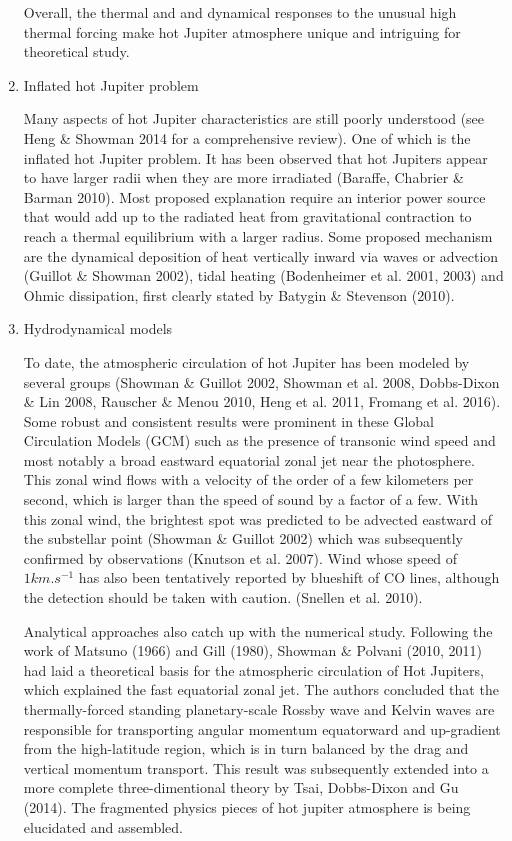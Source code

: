 \documentclass[11pt]{article}
\begin{document}
\begin{enumerate}
Overall, the thermal and and dynamical responses to the unusual high thermal forcing make hot Jupiter atmosphere unique and intriguing for theoretical study.

\item Inflated hot Jupiter problem

Many aspects of hot Jupiter characteristics are still poorly understood (see Heng \& Showman 2014 for a comprehensive review). One of which is the inflated hot Jupiter  problem. It has been observed that hot Jupiters appear to have larger radii when they are more irradiated (Baraffe, Chabrier \& Barman 2010). Most proposed explanation require an interior power source that would add up to the radiated heat from gravitational contraction to reach a thermal equilibrium with a larger radius. 
Some proposed mechanism are the dynamical deposition of heat vertically inward via waves or advection (Guillot \& Showman 2002), tidal heating (Bodenheimer et al. 2001, 2003) and Ohmic dissipation, first clearly stated by Batygin \& Stevenson (2010).  

\item Hydrodynamical models

To date, the atmospheric circulation of hot Jupiter has been modeled by several groups (Showman \& Guillot 2002, Showman et al. 2008, Dobbs-Dixon \& Lin 2008, Rauscher \& Menou 2010, Heng et al. 2011, Fromang et al. 2016). Some robust and consistent results were  prominent in these Global Circulation Models (GCM) such as the presence of transonic wind speed and most notably a broad eastward equatorial zonal jet near the photosphere. This zonal wind flows with a velocity of the order of a few kilometers per second, which is larger than the speed of sound by a factor of a few. With this zonal wind, the brightest spot was predicted to be advected eastward of the substellar point (Showman \& Guillot 2002) which was subsequently confirmed by observations (Knutson et al. 2007).  Wind whose speed of $1km.s^ {-1}$ has also been tentatively reported by blueshift of CO lines, although the detection should be taken with caution. (Snellen et al. 2010). 

Analytical approaches also catch up with the numerical study. Following the work of Matsuno (1966) and Gill (1980), Showman \& Polvani (2010, 2011) had laid a theoretical basis for the atmospheric circulation of Hot Jupiters, which explained the fast equatorial zonal jet. The authors concluded that the thermally-forced standing planetary-scale Rossby wave and Kelvin waves are responsible for transporting angular momentum equatorward and up-gradient from the high-latitude region, which is in turn balanced by the drag and vertical momentum transport. This result was subsequently extended into a more complete three-dimentional theory by Tsai, Dobbs-Dixon and Gu (2014). The fragmented physics pieces of hot jupiter atmosphere is being elucidated and assembled.


\end{enumerate}
\end{document}
